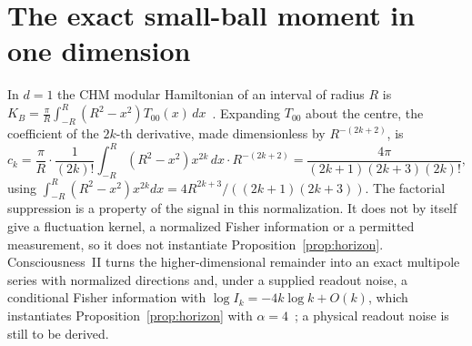 \section{The exact small-ball moment in one dimension}\label{app:chm}

In $d=1$ the CHM modular Hamiltonian of an interval of radius $R$ is $K_B=\frac{\pi}{R}\int_{-R}^{R}(R^2-x^2)T_{00}(x)\,dx$~\cite{CasiniHuertaMyers2011}. Expanding $T_{00}$ about the centre, the coefficient of the $2k$-th derivative, made dimensionless by $R^{-(2k+2)}$, is
\[
c_k=\frac{\pi}{R}\cdot\frac{1}{(2k)!}\int_{-R}^{R}(R^2-x^2)x^{2k}\,dx\cdot R^{-(2k+2)}=\frac{4\pi}{(2k+1)(2k+3)(2k)!},
\]
using $\int_{-R}^{R}(R^2-x^2)x^{2k}dx=4R^{2k+3}/((2k+1)(2k+3))$. The factorial suppression is a property of the signal in this normalization. It does not by itself give a fluctuation kernel, a normalized Fisher information or a permitted measurement, so it does not instantiate Proposition~\ref{prop:horizon}. Consciousness~II turns the higher-dimensional remainder into an exact multipole series with normalized directions and, under a supplied readout noise, a conditional Fisher information with $\log I_k=-4k\log k+O(k)$, which instantiates Proposition~\ref{prop:horizon} with $\alpha=4$~\cite{PaperII}; a physical readout noise is still to be derived.
